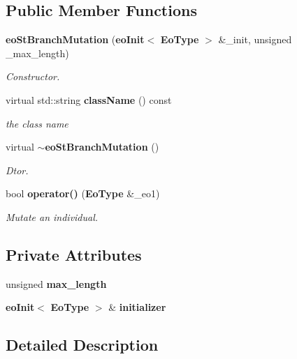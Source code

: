 \subsection*{Public Member Functions}
\begin{CompactItemize}
\item 
{\bf eo\-St\-Branch\-Mutation} ({\bf eo\-Init}$<$ {\bf Eo\-Type} $>$ \&\_\-init, unsigned \_\-max\_\-length)
\begin{CompactList}\small\item\em Constructor. \item\end{CompactList}\item 
virtual std::string {\bf class\-Name} () const \label{classeo_st_branch_mutation_a1}

\begin{CompactList}\small\item\em the class name \item\end{CompactList}\item 
virtual {\bf $\sim$eo\-St\-Branch\-Mutation} ()\label{classeo_st_branch_mutation_a2}

\begin{CompactList}\small\item\em Dtor. \item\end{CompactList}\item 
bool {\bf operator()} ({\bf Eo\-Type} \&\_\-eo1)
\begin{CompactList}\small\item\em Mutate an individual. \item\end{CompactList}\end{CompactItemize}
\subsection*{Private Attributes}
\begin{CompactItemize}
\item 
unsigned {\bf max\_\-length}\label{classeo_st_branch_mutation_r0}

\item 
{\bf eo\-Init}$<$ {\bf Eo\-Type} $>$ \& {\bf initializer}\label{classeo_st_branch_mutation_r1}

\end{CompactItemize}


\subsection{Detailed Description}
